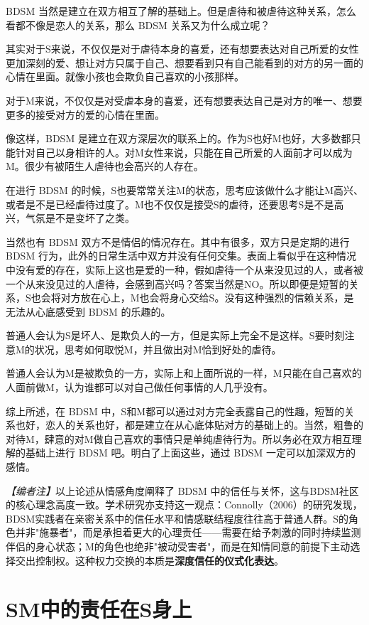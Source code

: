 \documentclass[12pt,UTF8]{ctexbook}
\begin{document}
BDSM 当然是建立在双方相互了解的基础上。但是虐待和被虐待这种关系，怎么看都不像是恋人的关系，那么 BDSM 关系又为什么成立呢？

其实对于S来说，不仅仅是对于虐待本身的喜爱，还有想要表达对自己所爱的女性更加深刻的爱、想让对方只属于自己、想要看到只有自己能看到的对方的另一面的心情在里面。就像小孩也会欺负自己喜欢的小孩那样。

对于M来说，不仅仅是对受虐本身的喜爱，还有想要表达自己是对方的唯一、想要更多的接受对方的爱的心情在里面。

像这样，BDSM 是建立在双方深层次的联系上的。作为S也好M也好，大多数都只能针对自己以身相许的人。对M女性来说，只能在自己所爱的人面前才可以成为M。很少有被陌生人虐待也会高兴的人存在。

在进行 BDSM 的时候，S也要常常关注M的状态，思考应该做什么才能让M高兴、或者是不是已经虐待过度了。M也不仅仅是接受S的虐待，还要思考S是不是高兴，气氛是不是变坏了之类。

当然也有 BDSM 双方不是情侣的情况存在。其中有很多，双方只是定期的进行 BDSM 行为，此外的日常生活中双方并没有任何交集。表面上看似乎在这种情况中没有爱的存在，实际上这也是爱的一种，假如虐待一个从来没见过的人，或者被一个从来没见过的人虐待，会感到高兴吗？答案当然是NO。所以即便是短暂的关系，S也会将对方放在心上，M也会将身心交给S。没有这种强烈的信赖关系，是无法从心底感受到 BDSM 的乐趣的。

普通人会认为S是坏人、是欺负人的一方，但是实际上完全不是这样。S要时刻注意M的状况，思考如何取悦M，并且做出对M恰到好处的虐待。

普通人会认为M是被欺负的一方，实际上和上面所说的一样，M只能在自己喜欢的人面前做M，认为谁都可以对自己做任何事情的人几乎没有。

综上所述，在 BDSM 中，S和M都可以通过对方完全表露自己的性趣，短暂的关系也好，恋人的关系也好，都是建立在从心底体贴对方的基础上的。当然，粗鲁的对待M，肆意的对M做自己喜欢的事情只是单纯虐待行为。所以务必在双方相互理解的基础上进行 BDSM 吧。明白了上面这些，通过 BDSM 一定可以加深双方的感情。

\textit{【编者注】}以上论述从情感角度阐释了 BDSM 中的信任与关怀，这与BDSM社区的核心理念高度一致。学术研究亦支持这一观点：Connolly（2006）的研究发现，BDSM实践者在亲密关系中的信任水平和情感联结程度往往高于普通人群。S的角色并非"施暴者"，而是承担着更大的心理责任——需要在给予刺激的同时持续监测伴侣的身心状态；M的角色也绝非"被动受害者"，而是在知情同意的前提下主动选择交出控制权。这种权力交换的本质是\textbf{深度信任的仪式化表达}。

\section{SM中的责任在S身上}
\end{document}
